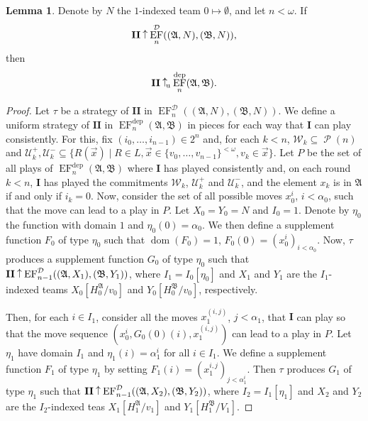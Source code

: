 \documentclass[12pt]{article}
\theoremstyle{definition}
\newtheorem{lemma}[definition]{Lemma}
\newcommand{\wins}{\mathbin{\raisebox{0.8\depth}{$\uparrow$}}}
\newcommand{\playerone}{\mathrm{\mathbf{I}}}
\newcommand{\playertwo}{\mathrm{\mathbf{II}}}
\DeclareMathOperator{\EF}{EF}
\newcommand{\EFdep}{\EF^{\mathrm{dep}}}
\newcommand{\winsu}{\wins_{\!\textrm u}}
\newcommand{\W}{\mathcal W}
\newcommand{\U}{\mathcal U}
\newcommand{\A}{\mathfrak{A}}
\newcommand{\B}{\mathfrak{B}}
\newcommand{\deplog}{\mathcal D}
\DeclareMathOperator{\Pow}{\mathcal{P}}
\DeclareMathOperator{\dom}{dom}
\begin{document}
\begin{lemma}\label{lemma: from auxiliary game to uniform game}
    Denote by $N$ the $1$-indexed team $0\mapsto\emptyset$, and let $n<\omega$. If
    \[
        \playertwo\wins\EF_n^\deplog((\A,N),(\B,N)),
    \]
    then
    \[
        \playertwo\winsu\EFdep_n(\A,\B).
    \]
\end{lemma}
\begin{proof}
    Let $\tau$ be a strategy of $\playertwo$ in $\EF_n^\deplog((\A,N),(\B,N))$. We define a uniform strategy of $\playertwo$ in $\EFdep_n(\A,\B)$ in pieces for each way that $\playerone$ can play consistently. For this, fix $(i_0,\dots,i_{n-1})\in 2^n$ and, for each $k<n$, $\W_k\subseteq\Pow(n)$ and $\U^+_k,\U^-_k\subseteq\{ R(\vec x) \mid R\in L, \vec x\in\{v_0,\dots,v_{n-1}\}^{<\omega}, v_k\in\vec x\}$. Let $P$ be the set of all plays of $\EFdep_n(\A,\B)$ where $\playerone$ has played consistently and, on each round $k<n$, $\playerone$ has played the commitments $\W_k$, $\U^+_k$ and $\U^-_k$, and the element $x_k$ is in $\A$ if and only if $i_k = 0$. Now, consider the set of all possible moves $x_0^i$, $i<\alpha_0$, such that the move can lead to a play in $P$. Let $X_0 = Y_0 = N$ and $I_0 = 1$. Denote by $\eta_0$ the function with domain $1$ and $\eta_0(0) = \alpha_0$. We then define a supplement function $F_0$ of type $\eta_0$ such that $\dom(F_0) = 1$, $F_0(0) = (x_0^i)_{i<\alpha_0}$. Now, $\tau$ produces a supplement function $G_0$ of type $\eta_0$ such that $\playertwo\wins\EF_{n-1}^\deplog((\A,X_1),(\B,Y_1))$, where $I_1 = I_0[\eta_0]$ and $X_1$ and $Y_1$ are the $I_1$-indexed teams $X_0[H_0^\A/v_0]$ and $Y_0[H_0^\B/v_0]$, respectively.

    Then, for each $i\in I_1$, consider all the moves $x_1^{(i,j)}$, $j<\alpha_1$, that $\playerone$ can play so that the move sequence $(x_0^i,G_0(0)(i),x_1^{(i,j)})$ can lead to a play in $P$. Let $\eta_1$ have domain $I_1$ and $\eta_1(i) = \alpha^i_1$ for all $i\in I_1$. We define a supplement function $F_1$ of type $\eta_1$ by setting $F_1(i) = (x_1^{i,j})_{j<\alpha_1^i}$. Then $\tau$ produces $G_1$ of type $\eta_1$ such that $\playertwo\wins\EF^\deplog_{n-1}((\A,X_2),(\B,Y_2))$, where $I_2 = I_1[\eta_1]$ and $X_2$ and $Y_2$ are the $I_2$-indexed teas $X_1[H_1^\A/v_1]$ and $Y_1[H_1^\B/V_1]$.


\end{proof}
\end{document}

